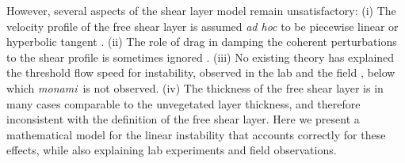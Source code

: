 \documentclass[aps,preprint,12pt]{revtex4-1}  %
\newcommand{\monami}{\textit{monami}}
\begin{document}
However, several aspects of the shear layer model remain unsatisfactory: 
(i)   The velocity profile of the free shear layer is assumed \textit{ad hoc} to be piecewise linear \cite{Delangre06} or hyperbolic tangent \cite{Ghisal02,Raupach96}. 
(ii)  The role of drag in damping the coherent perturbations to the shear profile is sometimes ignored \cite{Raupach96}. 
(iii) No existing theory has explained the threshold flow speed for instability, observed in the lab \cite{Ghisal02} and the field \cite{Grizzle96}, below which \monami ~is not observed.
(iv)  The thickness of the free shear layer is in many cases comparable to the unvegetated layer thickness, and therefore inconsistent with the definition of the free shear layer.
Here we present a mathematical model for the linear instability that accounts correctly for these effects, while also explaining lab experiments and field observations.
\end{document}
